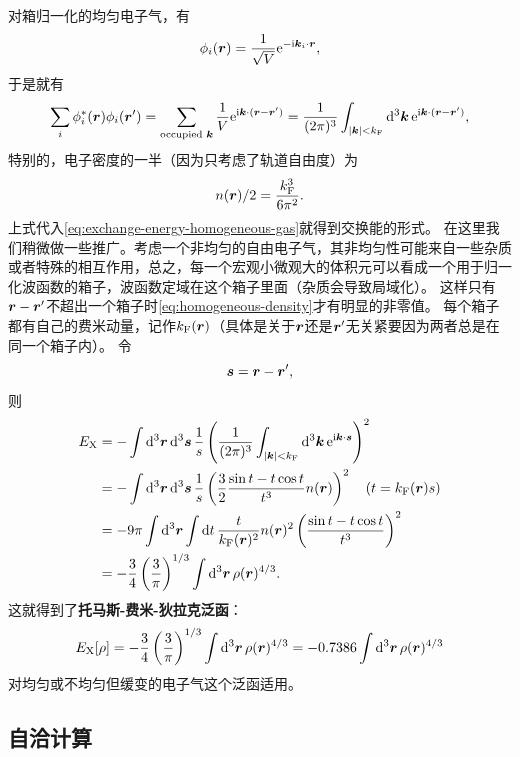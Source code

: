 \documentclass[hyperref, UTF8, a4paper]{ctexart}
\newcommand*{\ii}{\mathrm{i}}
\newcommand*{\ee}{\mathrm{e}}
\begin{document}
对箱归一化的均匀电子气，有
\[
    \phi_i(\vb*{r}) = \frac{1}{\sqrt{V}} \ee^{- \ii \vb*{k}_i \cdot \vb*{r}},
\]
于是就有
\begin{equation}
    \sum_i \phi_i^*(\vb*{r}) \phi_i(\vb*{r}') = \sum_{\text{occupied $\vb*{k}$}} \frac{1}{V} \ee^{\ii \vb*{k} \cdot (\vb*{r} - \vb*{r}')} = \frac{1}{(2\pi)^3} \int_{\abs{\vb*{k}} < k_\text{F}} \dd[3]{\vb*{k}} \ee^{\ii \vb*{k} \cdot (\vb*{r} - \vb*{r}')},
    \label{eq:homogeneous-density}
\end{equation}
特别的，电子密度的一半（因为只考虑了轨道自由度）为
\[
    n(\vb*{r}) / 2 = \frac{k_\text{F}^3}{6 \pi^2}.
\]
上式代入\eqref{eq:exchange-energy-homogeneous-gas}就得到交换能的形式。
在这里我们稍微做一些推广。考虑一个非均匀的自由电子气，其非均匀性可能来自一些杂质或者特殊的相互作用，总之，每一个宏观小微观大的体积元可以看成一个用于归一化波函数的箱子，波函数定域在这个箱子里面（杂质会导致局域化）。
这样只有$\vb*{r} - \vb*{r}'$不超出一个箱子时\eqref{eq:homogeneous-density}才有明显的非零值。
每个箱子都有自己的费米动量，记作$k_\text{F}(\vb*{r})$（具体是关于$\vb*{r}$还是$\vb*{r}'$无关紧要因为两者总是在同一个箱子内）。
令
\[
    \vb*{s} = \vb*{r} - \vb*{r}', 
\]
则
\[
    \begin{aligned}
        E_\text{X} &= - \int \dd[3]{\vb*{r}} \dd[3]{\vb*{s}} \frac{1}{s} \left( \frac{1}{(2\pi)^3} \int_{\abs{\vb*{k}} < k_\text{F}} \dd[3]{\vb*{k}} \ee^{\ii \vb*{k} \cdot \vb*{s}} \right)^2 \\
        &= - \int \dd[3]{\vb*{r}} \dd[3]{\vb*{s}} \frac{1}{s} \left( \frac{3}{2} \frac{\sin t - t \cos t}{t^3} n(\vb*{r}) \right)^2 \quad (t= k_\text{F}(\vb*{r}) s) \\
        &= - 9 \pi \int \dd[3]{\vb*{r}} \int \dd{t} \frac{t}{k_\text{F}(\vb*{r})^2} n(\vb*{r})^2 \left( \frac{\sin t - t \cos t}{t^3} \right)^2 \\
        &= - \frac{3}{4} \left( \frac{3}{\pi} \right)^{1/3} \int \dd[3]{\vb*{r}} \rho(\vb*{r})^{4/3}.
    \end{aligned}
\]
这就得到了\textbf{托马斯-费米-狄拉克泛函}：
\begin{equation}
    E_\text{X}[\rho] = - \frac{3}{4} \left( \frac{3}{\pi} \right)^{1/3} \int \dd[3]{\vb*{r}} \rho(\vb*{r})^{4/3} = - 0.7386 \int \dd[3]{\vb*{r}} \rho(\vb*{r})^{4/3}
\end{equation}
对均匀或不均匀但缓变的电子气这个泛函适用。

\subsection{自洽计算}
\end{document}
